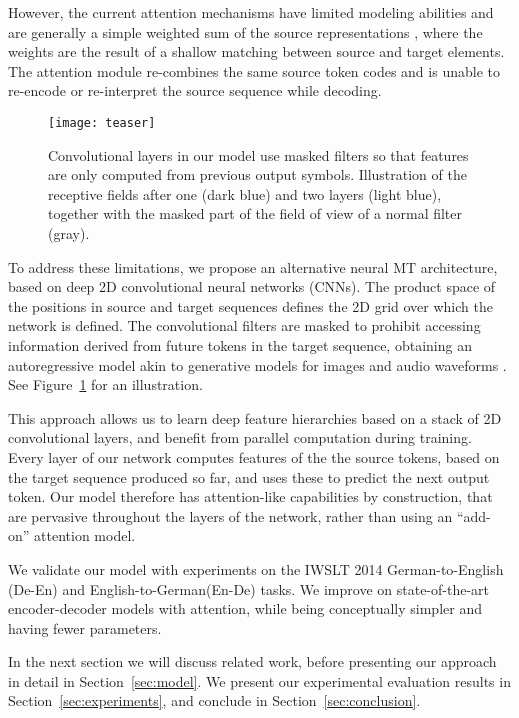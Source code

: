 \documentclass[11pt,a4paper]{article}
\def\fig#1{Figure~\ref{fig:#1}}
\def\sect#1{Section~\ref{sec:#1}}
\begin{document}
However, the current attention mechanisms have limited modeling abilities and are generally a simple weighted sum of the source representations \cite{ bahdanau15iclr, luong15emnlp}, where the weights are the result of a shallow matching between source and target elements. The attention module re-combines the same source token codes and is unable to re-encode or re-interpret the source sequence while decoding.
\begin{figure}
\begin{center}
\texttt{[image: teaser]}
\end{center}
\caption{Convolutional layers in our model use masked  filters so that features are only computed from previous output symbols. 
Illustration of the receptive fields after one (dark blue) and two layers (light blue), together with the masked part of the field of view of a normal  filter (gray).}
\label{fig:teaser}
\end{figure}

To address these limitations, we propose an alternative neural MT architecture, based on deep 2D convolutional neural networks (CNNs). 
The product space of the positions in source and target sequences defines the 2D grid over which the network is defined. 
The convolutional filters are masked to prohibit accessing information derived from future tokens in the target sequence, obtaining an autoregressive model akin to generative models for images and audio waveforms \cite{oord16ssw,oord16icml}.
See \fig{teaser} for an illustration.

This approach allows us to learn deep feature hierarchies based on a stack of 2D convolutional layers, and benefit from parallel computation during training.
Every layer of our network computes features of the the source tokens, based on the target sequence produced so far, and uses these to predict the next output token. 
Our model therefore has attention-like capabilities by construction, that are pervasive throughout the layers of the network, rather than using an ``add-on'' attention model.

We validate our model with experiments on the IWSLT 2014 German-to-English (De-En) and English-to-German(En-De) tasks.
We improve on state-of-the-art encoder-decoder models with attention, while being conceptually simpler and having fewer parameters.

In the next section we will discuss related work, before presenting our approach in detail in \sect{model}.
We present our experimental evaluation results in \sect{experiments}, and conclude in \sect{conclusion}. 
\end{document}
